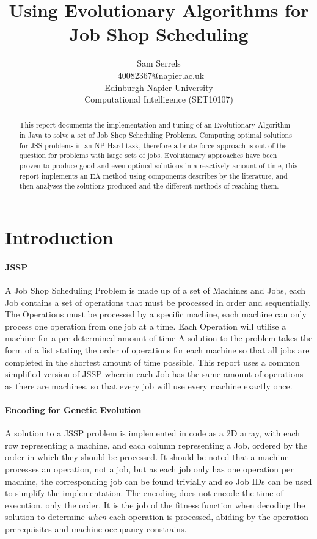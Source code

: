 \documentclass[14pt]{acmsiggraph}
\title{Using Evolutionary Algorithms for Job Shop Scheduling}
\author{Sam Serrels\\\ 40082367@napier.ac.uk \\
	Edinburgh Napier University\\
	Computational Intelligence (SET10107)}
\begin{document}
	
	\maketitle
	\begin{abstract}
		This report documents the implementation and tuning of an Evolutionary Algorithm in Java to solve a set of Job Shop Scheduling Problems. Computing optimal solutions for JSS problems in an NP-Hard task, therefore a brute-force approach is out of the question for problems with large sets of jobs. Evolutionary approaches have been proven to produce good and even optimal solutions in a reactively amount of time, this report implements an EA method using components describes by the literature, and then analyses the solutions produced and the different methods of reaching them.
	\end{abstract}
	
	\section{Introduction}
	\paragraph{JSSP}
	A Job Shop Scheduling Problem is made up of a set of Machines and Jobs, each Job contains a set of operations that must be processed in order and sequentially. The  Operations must be processed by a specific machine, each machine can only process one operation from one job at a time. Each Operation will utilise a machine for a pre-determined amount of time  A solution to the problem takes the form of a list stating the order of operations for each machine so that all jobs are completed in the shortest amount of time possible. This report uses a common simplified version of JSSP wherein each Job has the same amount of operations as there are machines, so that every job will use every machine exactly once.
	
	\paragraph{Encoding for Genetic Evolution}
	A solution to a JSSP problem is implemented in code as a 2D array, with each row representing a machine, and each column representing a Job, ordered by the order in which they should be processed. It should be noted that a machine processes an operation, not a job, but as each job only has one operation per machine, the corresponding job can be found trivially and so Job IDs can be used to simplify the implementation. The encoding does not encode the time of execution, only the order.  It is the job of the fitness function when decoding the solution to determine \textit{when} each operation is processed, abiding by the operation prerequisites and machine occupancy constrains. 
	
\end{document}
